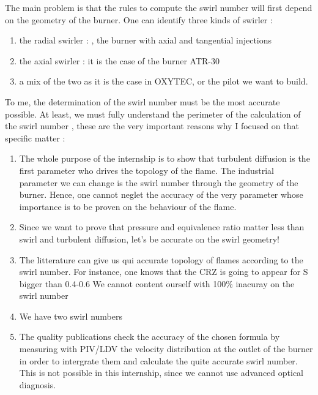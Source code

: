 The main problem is that the rules to compute the swirl number will first depend on the geometry of the burner. One can identify three kinds of swirler : 
\begin{enumerate}
\item the radial swirler : \cite{durox_flame_2013}, the burner with axial and tangential injections
\item the axial swirler : it is the case of the burner ATR-30
\item a mix of the two \cite{paul_jourdaine_nom_effect_2016} as it is the case in OXYTEC, or the pilot we want to build.
\end{enumerate}

To me, the determination of the swirl number must be the most accurate possible. At least, we must fully understand the perimeter of the calculation of the swirl number , these are the very important reasons why I focused on that specific matter :
\begin{enumerate}
\item The whole purpose of the internship is to show that turbulent diffusion is the first parameter who drives the topology of the flame. The industrial parameter we can change is the swirl number through the geometry of the burner. Hence, one cannot neglet the accuracy of the very parameter whose importance is to be proven on the behaviour of the flame.
\item Since we want to prove that pressure and equivalence ratio matter less than swirl and turbulent diffusion, let's be accurate on the swirl geometry!
\item The litterature can give us qui accurate topology of flames according to the swirl number. For instance, one knows that the CRZ is going to appear for S bigger than 0.4-0.6 We cannot content ourself with 100\% inacuray on the swirl number
\item We have two swirl numbers
\item The quality publications check the accuracy of the chosen formula by measuring with PIV/LDV the velocity distribution at the outlet of the burner in order to intergrate them and calculate the quite accurate swirl number. This is not possible in this internship, since we cannot use advanced optical diagnosis.
\end{enumerate}



 




